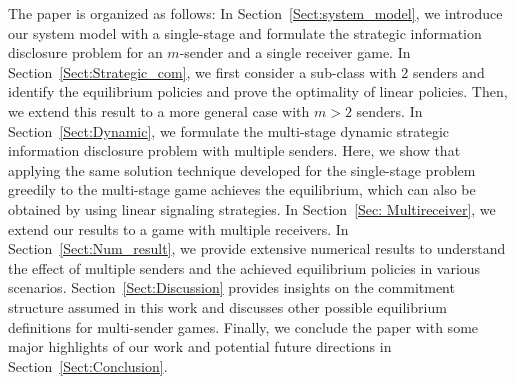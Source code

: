 \documentclass[12pt,journal,onecolumn]{IEEEtran}
\newcommand{\rknote}[1]{\noindent{\leavevmode\color{red}[Raj -- #1]}}
\begin{document}
The paper is organized as follows: In Section~\ref{Sect:system_model}, we introduce our system model with a single-stage and formulate the strategic information disclosure problem for an $m$-sender and a single receiver game. In Section~\ref{Sect:Strategic_com}, we first consider a sub-class with 2 senders and identify the equilibrium policies and prove the optimality of linear policies. Then, we extend this result to a more general case with $m>2$ senders. In Section~\ref{Sect:Dynamic}, we formulate the multi-stage dynamic strategic information disclosure problem with multiple senders. Here, we show that applying the same solution technique developed for the single-stage problem greedily to the multi-stage game achieves the equilibrium, which can also be obtained by using linear signaling strategies. In Section~\ref{Sec: Multireceiver}, we extend our results to a game with multiple receivers. In Section~\ref{Sect:Num_result}, we provide extensive numerical results to understand the effect of multiple senders and the achieved equilibrium policies in various scenarios. Section~\ref{Sect:Discussion} provides insights on the commitment structure assumed in this work and discusses other possible equilibrium definitions for multi-sender games. Finally, we conclude the paper with some major highlights of our work and potential future directions in Section~\ref{Sect:Conclusion}.

\end{document}
